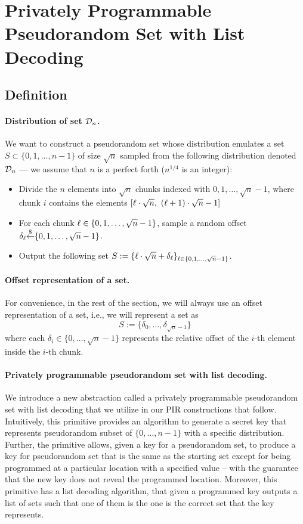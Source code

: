 \section{Privately Programmable Pseudorandom Set with List Decoding}
\label{sec:ppps}
\subsection{Definition}
\label{sec:ppps-defn}
\paragraph{Distribution of set $\mathcal{D}_n$.}
We want to construct a pseudorandom set 
whose distribution
emulates a set $S \subset \{0, 1, \ldots, n-1\}$ of size $\sqrt{n}$ 
sampled from the following distribution
denoted $\mathcal{D}_n$ --- 
we assume that $n$ is a perfect forth ($n^{1/4}$ is an integer): 
\begin{itemize}[leftmargin=5mm,itemsep=1pt]
\item 
Divide the $n$ elements into $\sqrt{n}$ chunks indexed
with $0, 1, \ldots, \sqrt{n}-1$, 
where chunk $i$ contains the elements  
$[\ell \cdot \sqrt{n}, \ (\ell+1) \cdot \sqrt{n} - 1]$
\item 
For each chunk $\ell \in \{0, 1, \ldots, \sqrt{n}-1\}$, 
sample a random offset $\delta_\ell {\overset{\$}{\leftarrow}} \{0, 1, \ldots, \sqrt{n}-1\}$.
\item 
Output the following set $S := 
\{\ell \cdot \sqrt{n} + \delta_\ell \}_{\ell \in \{0, 1, \ldots, \sqrt{n}-1\}}$.
\end{itemize}

\paragraph{Offset representation of a set.}
For convenience, in the rest of the section,
we will always use an offset representation of a set, i.e.,
we will represent a set 
as 
$$S := \{\delta_0, \ldots, \delta_{\sqrt{n}-1}\}$$
where each $\delta_i \in \{0, \ldots, \sqrt{n}-1\}$
represents the relative
offset of the $i$-th element 
inside the $i$-th chunk.

\paragraph{Privately programmable pseudorandom set with list decoding.}
We introduce a new abstraction called a privately programmable pseudorandom set with list decoding that we utilize in our PIR constructions that follow. Intuitively, this primitive provides an algorithm to generate a secret key that represents pseudorandom subset of $\{0,\ldots,n-1\}$ with a specific distribution. Further, the primitive allows, given a key for a pseudorandom set, to produce a key for pseudorandom set that is the same as the starting set except for being programmed at a particular location with a specified value -- with the guarantee that the new key does not reveal the programmed location. Moreover, this primitive has a list decoding algorithm, that given a programmed key outputs a list of sets such that one of them is the one is the correct set that the key represents.


